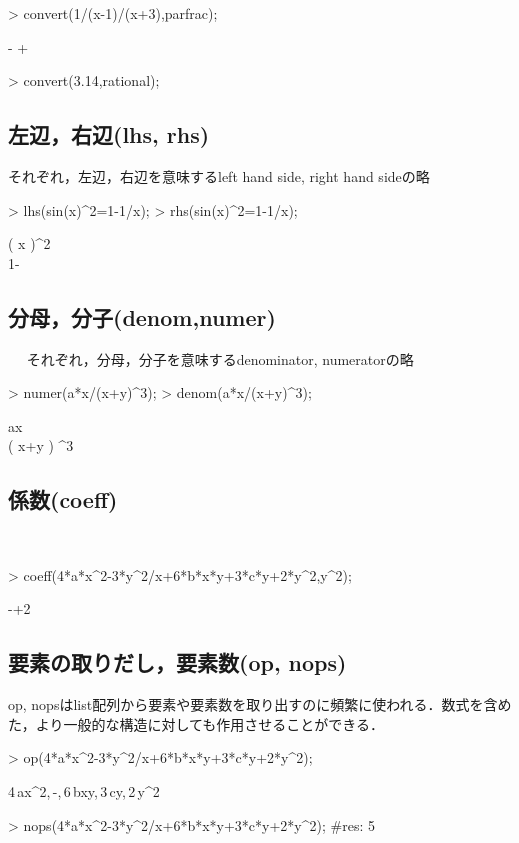 \begin{MapleInput}
> convert(1/(x-1)/(x+3),parfrac);
\end{MapleInput}
\begin{MapleOutput}
- + 
\end{MapleOutput}

\begin{MapleInput}
> convert(3.14,rational);
\end{MapleInput}
\begin{MapleOutput}
{}
\end{MapleOutput}

\subsection{左辺，右辺(lhs, rhs)}
それぞれ，左辺，右辺を意味するleft hand side, right hand sideの略
\begin{MapleInput}
> lhs(sin(x)^2=1-1/x);
> rhs(sin(x)^2=1-1/x);
\end{MapleInput}
\begin{MapleOutputGather}
\sin \left( x \right)^{2} \notag \\
1- \notag
\end{MapleOutputGather}

\subsection{分母，分子(denom,numer)}　
それぞれ，分母，分子を意味するdenominator, numeratorの略
\begin{MapleInput}
> numer(a*x/(x+y)^3);
> denom(a*x/(x+y)^3);
\end{MapleInput}
\begin{MapleOutputGather}
ax \notag \\
\left( x+y \right) ^{3} \notag
\end{MapleOutputGather}

\subsection{係数(coeff)}　
\begin{MapleInput}
> coeff(4*a*x^2-3*y^2/x+6*b*x*y+3*c*y+2*y^2,y^2);
\end{MapleInput}
\begin{MapleOutput}
-+2
\end{MapleOutput}

\subsection{要素の取りだし，要素数(op, nops)}
op, nopsはlist配列から要素や要素数を取り出すのに頻繁に使われる．数式を含めた，より一般的な構造に対しても作用させることができる．
\begin{MapleInput}
> op(4*a*x^2-3*y^2/x+6*b*x*y+3*c*y+2*y^2);
\end{MapleInput}
\begin{MapleOutput}
4\,a{x}^{2},\,-{},\,6\,bxy,\,3\,cy,\,2\,{y}^{2}
\end{MapleOutput}

\begin{MapleInput}
> nops(4*a*x^2-3*y^2/x+6*b*x*y+3*c*y+2*y^2); #res: 5
\end{MapleInput}
